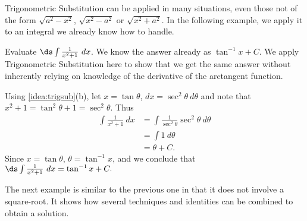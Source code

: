 Trigonometric Substitution can be applied in many situations, even those not of the form $\sqrt{a^2-x^2}$, $\sqrt{x^2-a^2}$ or $\sqrt{x^2+a^2}$. In the following example, we apply it to an integral we already know how to handle.

\begin{example}\label{ex_trigsub5}
Evaluate $\ds \int\frac1{x^2+1}\ dx$.
\solution
We know the answer already as $\tan^{-1}x+C$. We apply Trigonometric Substitution here to show that we get the same answer without inherently relying on knowledge of the derivative of the arctangent function.

Using \autoref{idea:trigsub}(b), let $x=\tan\theta$, $dx=\sec^2\theta\ d\theta$ and note that $x^2+1 = \tan^2\theta+1 = \sec^2\theta$. Thus
\begin{align*}
\int \frac1{x^2+1}\ dx &= \int \frac{1}{\sec^2\theta}\sec^2\theta\ d\theta \\
			&= \int 1\ d\theta\\
			&= \theta + C.
\end{align*}
Since $x=\tan \theta$, $\theta = \tan^{-1}x$, and we conclude that $\ds \int\frac1{x^2+1}\ dx = \tan^{-1}x+C.$
\end{example}

The next example is similar to the previous one in that it does not involve a square-root. It shows how several techniques and identities can be combined to obtain a solution.

